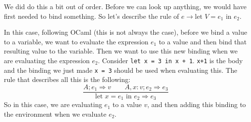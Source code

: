 \documentclass[main.tex]{subfiles}
\begin{document}
We did do this a bit out of order. Before we can look up anything, we would have first needed to bind something. So let's describe the rule of $e \rightarrow \text{let } V = e_1 \text{ in } e_2$. 

In this case, following OCaml (this is not always the case), before we bind a value to a variable, we want to evaluate the expression $e_1$ to a value and then bind that resulting value to the variable. Then we want to use this new binding when we are evaluating the expression $e_2$. Consider \texttt{let x = 3 in x + 1}. \texttt{x+1} is the body and the binding we just made \texttt{x = 3} should be used when evaluating this. 
The rule that describes all this is the following:
$$
\frac{A;e_1 \Rightarrow v \qquad A,x:v;e_2 \Rightarrow e_3}{\text{let } x = e_1 \text { in } e_2 \Rightarrow e_3}
$$
So in this case, we are evaluating $e_1$ to a value $v$, and then adding this binding to the environment when we evaluate $e_2$. 
\end{document}
